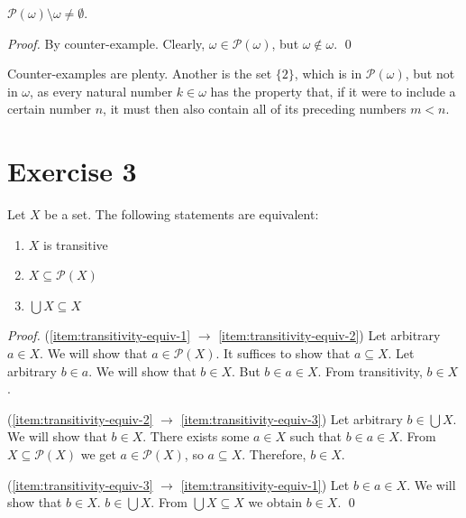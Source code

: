 \documentclass[11pt]{llncs}
\begin{document}
\begin{lemma}
  $\mathcal{P}(\omega) \setminus \omega \neq \emptyset$.
\end{lemma}
\begin{proof}
  By counter-example. Clearly, $\omega \in \mathcal{P}(\omega)$, but
  $\omega \not\in \omega$.
  \qed
\end{proof}

Counter-examples are plenty. Another is the set $\{2\}$, which is in
$\mathcal{P}(\omega)$, but not in $\omega$, as every natural number
$k \in \omega$ has the property that, if it were to include a certain number
$n$, it must then also contain all of its preceding numbers $m < n$.

\section*{Exercise 3}
\begin{lemma}\label{lem:transitivity-equiv}
  Let $X$ be a set. The following statements are equivalent:
  \begin{enumerate}
    \item $X$ is transitive \label{item:transitivity-equiv-1}
    \item $X \subseteq \mathcal{P}(X)$ \label{item:transitivity-equiv-2}
    \item $\bigcup X \subseteq X$ \label{item:transitivity-equiv-3}
  \end{enumerate}
\end{lemma}
\begin{proof}
  \item{(\ref{item:transitivity-equiv-1} $\rightarrow$ \ref{item:transitivity-equiv-2})}
  Let arbitrary $a \in X$. We will show that $a \in \mathcal{P}(X)$.
  It suffices to show that $a \subseteq X$. Let arbitrary $b \in a$.
  We will show that $b \in X$. But $b \in a \in X$. From transitivity, $b \in X$.

  \item{(\ref{item:transitivity-equiv-2} $\rightarrow$ \ref{item:transitivity-equiv-3})}
  Let arbitrary $b \in \bigcup X$. We will show that $b \in X$.
  There exists some $a \in X$ such that $b \in a \in X$. From $X \subseteq \mathcal{P}(X)$ we get
  $a \in \mathcal{P}(X)$, so $a \subseteq X$. Therefore, $b \in X$.

  \item{(\ref{item:transitivity-equiv-3} $\rightarrow$ \ref{item:transitivity-equiv-1})}
  Let $b \in a \in X$. We will show that $b \in X$. $b \in \bigcup X$. From
  $\bigcup X \subseteq X$ we obtain $b \in X$.
  \qed
\end{proof}
\end{document}
